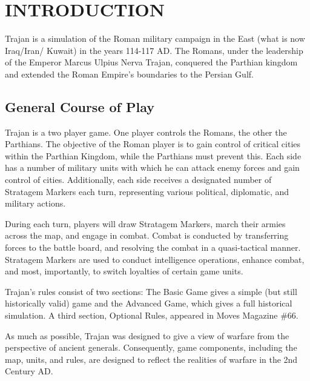 \section{INTRODUCTION}

Trajan is a simulation of the Roman military campaign in the East (what is now Iraq/Iran/ Kuwait) in the years 114-117 AD. The Romans, under the leadership of the Emperor Marcus Ulpius Nerva Trajan, conquered the Parthian kingdom and extended the Roman Empire's boundaries to the Persian Gulf.

\subsection{General Course of Play}

Trajan is a two player game. One player controls the Romans, the other the Parthians. The objective of the Roman player is to gain control of critical cities within the Parthian Kingdom, while the Parthians must prevent this. Each side has a number of military units with which he can attack enemy forces and gain control of cities. Additionally, each side receives a designated number of Stratagem Markers each turn, representing various political, diplomatic, and military actions.

During each turn, players will draw Stratagem Markers, march their armies across the map, and engage in combat. Combat is conducted by transferring forces to the battle board, and resolving the combat in a quasi-tactical manner. Stratagem Markers are used to conduct intelligence operations, enhance combat, and most, importantly, to switch loyalties of certain game units.

Trajan's rules consist of two sections: The Basic Game gives a simple (but still historically valid) game and the Advanced Game, which gives a full historical simulation. A third section, Optional Rules, appeared in Moves Magazine \#66.

As much as possible, Trajan was designed to give a view of warfare from the perspective of ancient generals. Consequently, game components, including the map, units, and rules, are designed to reflect the realities of warfare in the 2nd Century AD.
